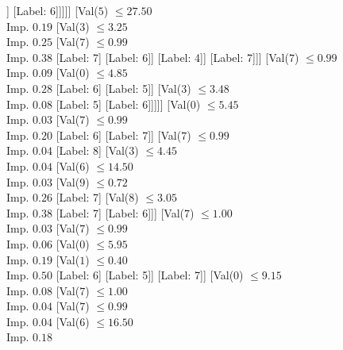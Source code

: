 \documentclass[margin=10pt]{standalone}
\begin{document}
\begin{forest}
								[Val($7$) $ \leq 0.99$ \\ Imp. $0.11$
									[Label: 6]
									[Val($7$) $ \leq 0.99$ \\ Imp. $0.17$
										[Label: 5]
										[Val($4$) $ \leq 0.07$ \\ Imp. $0.11$
											[Val($7$) $ \leq 0.99$ \\ Imp. $0.50$
												[Label: 6]
												[Label: 5]]
											[Label: 6]]]]]
							[Val($5$) $ \leq 27.50$ \\ Imp. $0.19$
								[Val($3$) $ \leq 3.25$ \\ Imp. $0.25$
									[Val($7$) $ \leq 0.99$ \\ Imp. $0.38$
										[Label: 7]
										[Label: 6]]
									[Label: 4]]
								[Label: 7]]]
						[Val($7$) $ \leq 0.99$ \\ Imp. $0.09$
							[Val($0$) $ \leq 4.85$ \\ Imp. $0.28$
								[Label: 6]
								[Label: 5]]
							[Val($3$) $ \leq 3.48$ \\ Imp. $0.08$
								[Label: 5]
								[Label: 6]]]]]
				[Val($0$) $ \leq 5.45$ \\ Imp. $0.03$
					[Val($7$) $ \leq 0.99$ \\ Imp. $0.20$
						[Label: 6]
						[Label: 7]]
					[Val($7$) $ \leq 0.99$ \\ Imp. $0.04$
						[Label: 8]
						[Val($3$) $ \leq 4.45$ \\ Imp. $0.04$
							[Val($6$) $ \leq 14.50$ \\ Imp. $0.03$
								[Val($9$) $ \leq 0.72$ \\ Imp. $0.26$
									[Label: 7]
									[Val($8$) $ \leq 3.05$ \\ Imp. $0.38$
										[Label: 7]
										[Label: 6]]]
								[Val($7$) $ \leq 1.00$ \\ Imp. $0.03$
									[Val($7$) $ \leq 0.99$ \\ Imp. $0.06$
										[Val($0$) $ \leq 5.95$ \\ Imp. $0.19$
											[Val($1$) $ \leq 0.40$ \\ Imp. $0.50$
												[Label: 6]
												[Label: 5]]
											[Label: 7]]
										[Val($0$) $ \leq 9.15$ \\ Imp. $0.08$
											[Val($7$) $ \leq 1.00$ \\ Imp. $0.04$
												[Val($7$) $ \leq 0.99$ \\ Imp. $0.04$
													[Val($6$) $ \leq 16.50$ \\ Imp. $0.18$

\end{forest}
\end{document}
